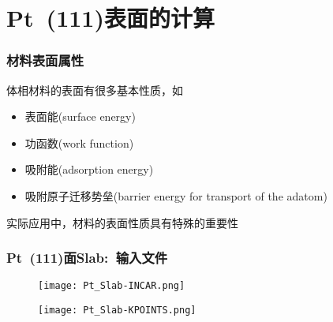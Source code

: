 \section{\rm{Pt~(111)}表面的计算}\label{Sec:Surface-Pt}
\frame
{
	\frametitle{材料表面属性}
体相材料的表面有很多基本性质，如
\begin{itemize}
	\item 表面能\textrm{(surface energy)}
	\item 功函数\textrm{(work function)}
	\item 吸附能\textrm{(adsorption energy)}
	\item 吸附原子迁移势垒\textrm{(barrier energy for transport of the adatom)}
\end{itemize}
实际应用中，材料的表面性质具有特殊的重要性%
{\fontsize{8.0pt}{5.2pt}\selectfont{
	\begin{itemize}
		\item 表面能是表面形貌学研究(向外/向内弛豫、重构、屈服分析)和裂纹扩散到断裂研究的重要因素
		\item 功函数、吸附能/解吸能和势垒能量是研究表面氧化、薄膜表面和纳米结构的生长和稳定、腐蚀、钝化和催化反应的决定因素%
	\end{itemize}
}}
}
\frame
{
	\frametitle{\textrm{Pt~(111)}面\textrm{Slab}:~输入文件}
	{\fontsize{9.5pt}{5.2pt}}%
\begin{figure}[h!]
\centering
\vskip -5pt
\texttt{[image: Pt\_Slab-INCAR.png]}
\caption{\fontsize{6.2pt}{5.2pt}}%
\label{Pt_Slab-INCAR}
\end{figure}
\begin{figure}[h!]
\centering
\vskip -5pt
\texttt{[image: Pt\_Slab-KPOINTS.png]}
\caption{\fontsize{6.2pt}{5.2pt}}%
\label{Pt_Slab-KPOINTS}
\end{figure}
}
